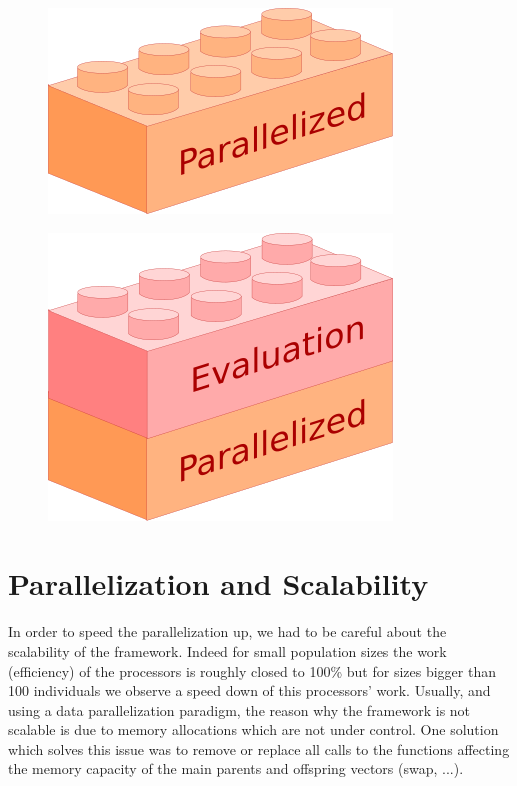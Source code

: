 \begin{figure}[H]
  \centering
  \includegraphics[scale=0.5]{images/parallelized_box}
\end{figure}

\begin{figure}[H]
  \centering
  \includegraphics[scale=0.5]{images/evaluation_parallelized_boxes}
\end{figure}

\section{Parallelization and Scalability}

In order to speed the parallelization up, we had to be careful about the scalability of the framework. Indeed for small population sizes the work (efficiency) of the processors is roughly closed to 100\% but for sizes bigger than 100 individuals we observe a speed down of this processors' work. Usually, and using a data parallelization paradigm, the reason why the framework is not scalable is due to memory allocations which are not under control. One solution which solves this issue was to remove or replace all calls to the functions affecting the memory capacity of the main parents and offspring vectors (swap, ...).

